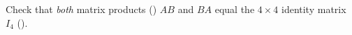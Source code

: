 Check that {\em both} matrix products () $AB$ and $BA$ equal the $4\times 4$ identity matrix $I_4$ ().